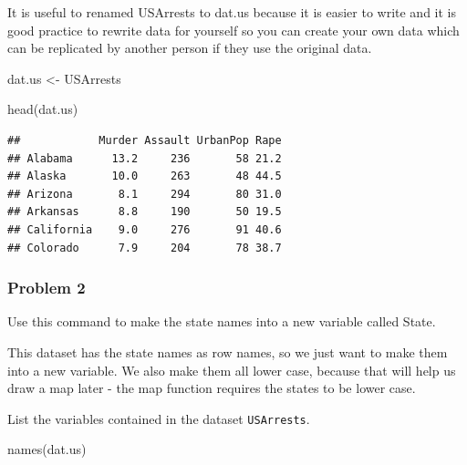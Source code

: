 \documentclass[
]{article}
\newenvironment{Shaded}{\begin{snugshade}}{\end{snugshade}}
\newcommand{\FunctionTok}[1]{\textcolor[rgb]{0.00,0.00,0.00}{#1}}
\newcommand{\NormalTok}[1]{#1}
\newcommand{\OtherTok}[1]{\textcolor[rgb]{0.56,0.35,0.01}{#1}}
\newcommand{\SpecialCharTok}[1]{\textcolor[rgb]{0.00,0.00,0.00}{#1}}
\begin{document}
It is useful to renamed USArrests to dat.us because it is easier to
write and it is good practice to rewrite data for yourself so you can
create your own data which can be replicated by another person if they
use the original data.

\begin{Shaded}
\begin{Highlighting}[]
\NormalTok{dat.us }\OtherTok{\textless{}{-}}\NormalTok{ USArrests}

\FunctionTok{head}\NormalTok{(dat.us)}
\end{Highlighting}
\end{Shaded}

\begin{verbatim}
##            Murder Assault UrbanPop Rape
## Alabama      13.2     236       58 21.2
## Alaska       10.0     263       48 44.5
## Arizona       8.1     294       80 31.0
## Arkansas      8.8     190       50 19.5
## California    9.0     276       91 40.6
## Colorado      7.9     204       78 38.7
\end{verbatim}

\hypertarget{problem-2}{%
\subsubsection{Problem 2}\label{problem-2}}

Use this command to make the state names into a new variable called
State.

\begin{Shaded}
\end{Shaded}

This dataset has the state names as row names, so we just want to make
them into a new variable. We also make them all lower case, because that
will help us draw a map later - the map function requires the states to
be lower case.

List the variables contained in the dataset \texttt{USArrests}.

\begin{Shaded}
\begin{Highlighting}[]
\FunctionTok{names}\NormalTok{(dat.us)}
\end{Highlighting}
\end{Shaded}
\end{document}

